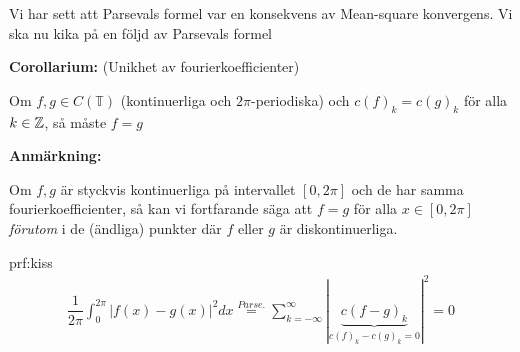 \noindent Vi har sett att Parsevals formel var en konsekvens av Mean-square konvergens. Vi ska nu kika på en följd av Parsevals formel
\par\bigskip
\noindent\textbf{Corollarium:} (Unikhet av fourierkoefficienter)\par
\noindent Om $f,g\in C(\mathbb{T})$ (kontinuerliga och $2\pi$-periodiska) och $c(f)_k = c(g)_k$ för alla $k\in\mathbb{Z}$, så måste $f = g$
\par\bigskip
\noindent\textbf{Anmärkning:}\par
\noindent Om $f,g$ är styckvis kontinuerliga på intervallet $[0,2\pi]$ och de har samma fourierkoefficienter, så kan vi fortfarande säga att $f=g$ för alla $x\in[0,2\pi]$ \textit{förutom} i de (ändliga) punkter där $f$ eller $g$ är diskontinuerliga. 
\par\bigskip
\begin{prf}[Skiss]{prf:kiss}
  \begin{equation*}
    \begin{gathered}
      \dfrac{1}{2\pi}\int_{0}^{2\pi}\left|f(x)-g(x)\right|^2dx \stackrel{Parse.}{=}\sum_{k=-\infty}^{\infty}|\underbrace{c(f-g)_k}_{\text{$c(f)_k-c(g)_k = 0$}}|^2 = 0
    \end{gathered}
  \end{equation*}
\end{prf}

